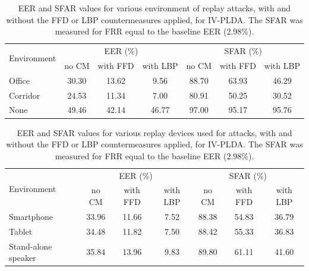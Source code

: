 \begin{table}
\begin{center}
    \begin{tabular}{ l || c c c | c c c}
    \hline
 \multirow{2}{*}{Environment}  & \multicolumn{3}{c|}{EER (\%)} & \multicolumn{3}{c}{SFAR (\%)} \\
     	 & no CM & with FFD & with LBP & no CM & with FFD & with LBP\\ 

 \hline \hline
Office   & 30.30 & 13.62 & 9.56 & 88.70 & 63.93 & 46.29\\
Corridor & 24.53 & 11.34 & 7.00 & 80.91 & 50.25 & 30.52\\
None & 49.46 & 42.14 & 46.77 & 97.00 & 95.17 & 95.76\\
\hline
    \end{tabular}
    \caption{EER and SFAR values for various environment of replay attacks, with and without the FFD or LBP countermeasures applied, for IV-PLDA. The SFAR was measured for FRR equal to the baseline EER (2.98\%).}
		\label{tab::results_CM_rooms}
   \end{center}
\end{table}


\begin{table}
\begin{center}
    \begin{tabular}{ l || c c c | c c c}
    \hline
 \multirow{2}{*}{Environment}  & \multicolumn{3}{c|}{EER (\%)} & \multicolumn{3}{c}{SFAR (\%)} \\
     	 & no CM & with FFD & with LBP & no CM & with FFD & with LBP\\ 
 \hline \hline
Smartphone   & 33.96 & 11.66 & 7.52 & 88.38 & 54.83 & 36.79\\
Tablet & 34.48 & 11.82 & 7.50 & 88.42 & 55.33 & 36.83\\
Stand-alone speaker & 35.84 & 13.96 & 9.83 & 89.80 & 61.11 & 41.60\\
\hline
    \end{tabular}
    \caption{EER and SFAR values for various replay devices used for attacks, with and without the FFD or LBP countermeasures applied, for IV-PLDA. The SFAR was measured for FRR equal to the baseline EER (2.98\%).}
		\label{tab::results_CM_spk}
   \end{center}
\end{table}


